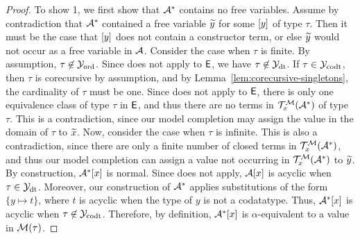 \begin{proof}
To show 1, we first show that $\mathcal{A}^\ast$ contains no free variables.
Assume by contradiction that $\mathcal{A}^\ast$ contained a free variable ${\widetilde{y}}$ for some $[y]$ of type $\tau$.
Then it must be the case that $[y]$ does not contain a constructor term,
or else ${\widetilde{y}}$ would not occur as a free variable in $\mathcal{A}$.
Consider the case when $\tau$ is finite.
By assumption, $\tau \not\in \mathcal{Y}_{\mathrm{ord}}$.
Since  does not apply to $\mathsf{E}$, we have $\tau \not\in \mathcal{Y}_{\mathrm{dt}}$.
If $\tau \in \mathcal{Y}_{\mathrm{codt}}$, then $\tau$ is corecursive by assumption, and by Lemma~\ref{lem:corecursive-singletons},
the cardinality of $\tau$ must be one.
Since  does not apply to $\mathsf{E}$,
there is only one equivalence class of type $\tau$ in $\mathsf{E}$,
and thus there are no terms in $\mathcal{T}^{\mathcal{M}}_x(\mathcal{A}^\ast)$ of type $\tau$.
This is a contradiction, since our model completion may assign the value in the domain of $\tau$ to ${\widetilde{x}}$.
Now, consider the case when $\tau$ is infinite.
This is also a contradiction, 
since there are only a finite number of closed terms in $\mathcal{T}^{\mathcal{M}}_x(\mathcal{A}^\ast)$,
and thus our model completion can assign a value not occurring in $\mathcal{T}^{\mathcal{M}}_x(\mathcal{A}^\ast)$ to ${\widetilde{y}}$.
By construction, $\mathcal{A}^\ast [x]$ is normal.
Since  does not apply, $\mathcal{A} [x]$ is acyclic when $\tau \in \mathcal{Y}_{\mathrm{dt}}$.
Moreover, our construction of $\mathcal{A}^\ast$ applies substitutions of the form 
$\{ y \mapsto t \}$, where $t$ is acyclic when the type of $y$ is not a codatatype.
Thus, $\mathcal{A}^\ast [x]$ is acyclic when $\tau \not\in \mathcal{Y}_{\mathrm{codt}}$.
Therefore, by definition, $\mathcal{A}^\ast [x]$ is $\alpha$-equivalent to a value in $\mathcal{M}( \tau )$.


\end{proof}
